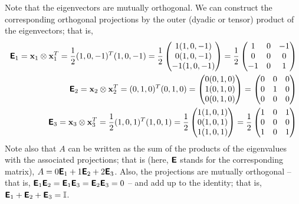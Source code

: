 {Note that the eigenvectors are mutually orthogonal.
We can construct the corresponding orthogonal projections by the outer (dyadic or tensor) product
of the eigenvectors; that is,
\begin{equation}
\begin{split}
\textsf{\textbf{E}}_1 =
{\bf x}_1 \otimes {\bf x}_1^T =
\frac{1}{2} (1,0,-1)^T(1,0,-1) =
\frac{1}{2}
\begin{pmatrix}
1(1,0,-1)\\
0(1,0,-1)\\
-1(1,0,-1)
\end{pmatrix} =
\frac{1}{2}
\begin{pmatrix}
1&0&-1\\
0&0&0\\
-1&0&1
\end{pmatrix}
\\
\textsf{\textbf{E}}_{2} =
{\bf x}_{2} \otimes {\bf x}_{2}^T =
 (0,1,0)^T(0,1,0) =
\begin{pmatrix}
0(0,1,0)\\
1(0,1,0)\\
0(0,1,0)
\end{pmatrix} =
\begin{pmatrix}
0&0&0\\
0&1&0\\
0&0&0
\end{pmatrix}
\\
\textsf{\textbf{E}}_{3} =
{\bf x}_{3} \otimes {\bf x}_{3}^T =
\frac{1}{2} (1,0,1)^T(1,0,1) =
\frac{1}{2}
\begin{pmatrix}
1(1,0,1)\\
0(1,0,1)\\
1(1,0,1)
\end{pmatrix} =
\frac{1}{2}
\begin{pmatrix}
1&0&1\\
0&0&0\\
1&0&1
\end{pmatrix}
\end{split}
\end{equation}
Note also that $A$ can be written as the sum of the products of the
eigenvalues with the associated projections; that is (here, $\textsf{\textbf{E}}$
stands for the corresponding matrix),
$A= 0  \textsf{\textbf{E}}_1 + 1  \textsf{\textbf{E}}_{2} +2\textsf{\textbf{E}}_{3} $.
Also, the projections are mutually orthogonal
-- that is,
$\textsf{\textbf{E}}_1 \textsf{\textbf{E}}_2 = \textsf{\textbf{E}}_1\textsf{\textbf{E}}_3=\textsf{\textbf{E}}_2\textsf{\textbf{E}}_3=0$
--
and add up to the identity; that is,
$\textsf{\textbf{E}}_1+\textsf{\textbf{E}}_2+\textsf{\textbf{E}}_3={\Bbb I}$.
{\textrm{\eexample}}
}


